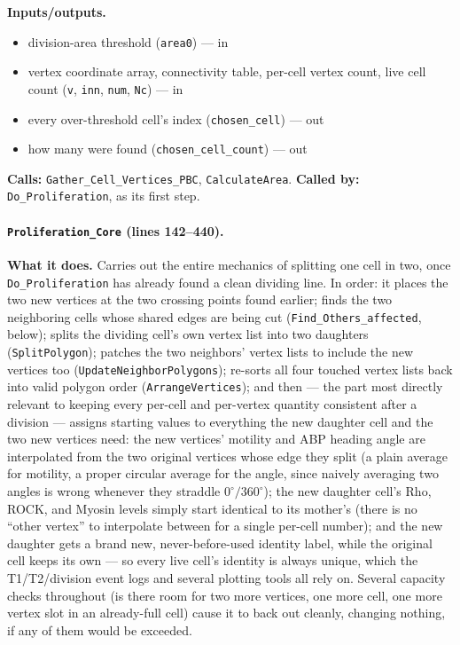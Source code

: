 \documentclass[11pt]{article}
\begin{document}
\textbf{Inputs/outputs.}
\begin{itemize}[nosep]
  \item division-area threshold (\texttt{area0}) --- in
  \item vertex coordinate array, connectivity table, per-cell vertex count, live cell count (\texttt{v}, \texttt{inn}, \texttt{num}, \texttt{Nc}) --- in
  \item every over-threshold cell's index (\texttt{chosen\_cell}) --- out
  \item how many were found (\texttt{chosen\_cell\_count}) --- out
\end{itemize}

\textbf{Calls:} \texttt{Gather\_Cell\_Vertices\_PBC}, \texttt{CalculateArea}.
\textbf{Called by:} \texttt{Do\_Proliferation}, as its first step.

\paragraph{\texttt{Proliferation\_Core} (lines 142--440).}
\textbf{What it does.} Carries out the entire mechanics of splitting one cell in two,
once \texttt{Do\_Proliferation} has already found a clean dividing line. In order: it
places the two new vertices at the two crossing points found earlier; finds the two
neighboring cells whose shared edges are being cut (\texttt{Find\_Others\_affected},
below); splits the dividing cell's own vertex list into two daughters
(\texttt{SplitPolygon}); patches the two neighbors' vertex lists to include the new
vertices too (\texttt{UpdateNeighborPolygons}); re-sorts all four touched vertex lists
back into valid polygon order (\texttt{ArrangeVertices}); and then --- the part most
directly relevant to keeping every per-cell and per-vertex quantity consistent after a
division --- assigns starting values to everything the new daughter cell and the two
new vertices need: the new vertices' motility and ABP heading angle are interpolated
from the two original vertices whose edge they split (a plain average for motility, a
proper circular average for the angle, since naively averaging two angles is wrong
whenever they straddle $0^\circ/360^\circ$); the new daughter cell's Rho, ROCK, and
Myosin levels simply start identical to its mother's (there is no ``other vertex'' to
interpolate between for a single per-cell number); and the new daughter gets a brand
new, never-before-used identity label, while the original cell keeps its own --- so
every live cell's identity is always unique, which the T1/T2/division event logs and
several plotting tools all rely on. Several capacity checks throughout (is there room
for two more vertices, one more cell, one more vertex slot in an already-full cell)
cause it to back out cleanly, changing nothing, if any of them would be exceeded.
\end{document}
